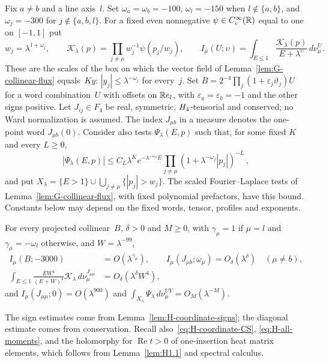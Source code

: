 Fix $a\ne b$ and a line axis~$l$. Set $\omega_a=\omega_b=-100$, $\omega_l=-150$ when $l\notin\{a,b\}$, and $\omega_j=-300$ for $j\notin\{a,b,l\}$. For a fixed even nonnegative $\psi\in C_c^\infty(\mathbb{R})$ equal to one on $[-1,1]$ put
\begin{equation*}
w_j=\lambda^{1+\omega_j},\qquad \mathcal K_\lambda(p)=\prod_{j\ne\mu}w_j^{-1}\psi(p_j/w_j),\qquad
I_\mu(U;\upsilon)=\int_{E\le1}\frac{\mathcal K_\lambda(p)}{E+\lambda^\upsilon}\,d\nu_\mu^U.
\end{equation*}
These are the scales of the box on which the vector field of Lemma~\ref{lem:G-collinear-flux} equals~$Ky$: $|y_j|\le\lambda^{-\omega_j}$ for every~$j$. Set $B=2^{-4}\prod_j(1+\varepsilon_j\vartheta_j)U$ for a word combination~$U$ with offsets on $\mathbb{R} e_l$, with $\varepsilon_a=\varepsilon_b=-1$ and the other signs positive. Let $J_{ij}\in F_4$ be real, symmetric, $H_4$-tensorial and conserved; no Ward normalization is assumed. The index $J_{\mu b}$ in a measure denotes the one-point word $J_{\mu b}(0)$. Consider also tests $\Psi_\lambda(E,p)$ such that, for some fixed $K$ and every $L\ge0$,
\begin{equation}\label{eq:H-scaled-tests}
|\Psi_\lambda(E,p)|\le C_L\lambda^K e^{-\lambda^{-\omega_\mu}E}
\prod_{j\ne\mu}(1+\lambda^{-\omega_j}|p_j|)^{-L}\,,
\end{equation}
and put $X_\lambda=\{E>1\}\cup\bigcup_{j\ne\mu}\{|p_j|>w_j\}$. The scaled Fourier--Laplace tests of Lemma~\ref{lem:G-collinear-flux}, with fixed polynomial prefactors, have this bound. Constants below may depend on the fixed words, tensor, profiles and exponents.
\begin{lemma}\label{lem:H-G3}
For every projected collinear~$B$, $\delta>0$ and $M\ge0$, with $\gamma_\mu=1$ if $\mu=l$ and $\gamma_\mu=-\omega_l$ otherwise, and $W=\lambda^{-99}$,
\begin{align}
I_\mu(B;-3000)&=O(\lambda^{\gamma_\mu}),\qquad
I_\mu(J_{\mu b};\omega_\mu)=O_\delta(\lambda^\delta)\quad(\mu\ne b),\label{eq:G-spectral-input}\\
\int_{E\le1}\frac{EW^4}{(E+W)^4}\mathcal K_\lambda\,d\nu_\mu^{J_{\mu\mu}}&=O_\delta(\lambda^\delta W^4),\label{eq:G-mass-input}
\end{align}
and $I_\mu(J_{\mu\mu};0)=O(\lambda^{900})$ and $\int_{X_\lambda}\Psi_\lambda\,d\nu_\mu^{UV}=O_M(\lambda^{-M})$.
\end{lemma}
The sign estimates come from Lemma~\ref{lem:H-coordinate-signs}; the diagonal estimate comes from conservation. Recall also~\eqref{eq:H-coordinate-CS}, \eqref{eq:H-all-moments}, and the holomorphy for $\operatorname{Re}t>0$ of one-insertion heat matrix elements, which follows from Lemma~\ref{lem:H1.1} and spectral calculus.
